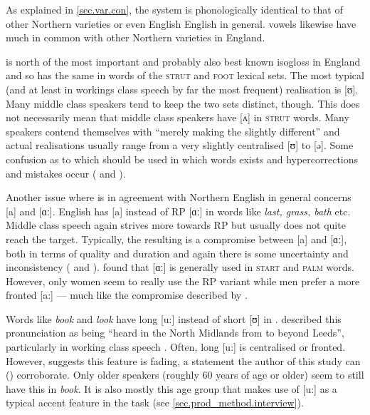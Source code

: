 As explained in \ref{sec.var.con}, the   system is phonologically identical to that of other Northern varieties or even English English in general.
 vowels likewise have much in common with other Northern varieties in England.

 is north of the most important and probably also best known isogloss in England and so has the same  in words of the \textsc{strut} and \textsc{foot} lexical sets.
The most typical (and at least in workings class speech by far the most frequent) realisation is [ʊ].
Many middle class speakers tend to keep the  two sets distinct, though.
This does not necessarily mean that middle class speakers have [ʌ] in \textsc{strut} words.
Many speakers contend themselves with ``merely making the  slightly different'' \citep[284]{knowles1973} and actual realisations usually range from a very slightly centralised [ʊ] to [ə].
Some confusion as to which  should be used in which words exists and hypercorrections and mistakes occur (\citealp[cf.][286--287]{knowles1973} and \citealp[83]{knowles1978}).

Another issue where  is in agreement with Northern English in general concerns [a] and [ɑː].
 English has [a] instead of RP [ɑː] in words like \emph{last, grass, bath} etc.
Middle class speech again strives more towards RP but usually does not quite reach the target.
Typically, the resulting  is a compromise between [a] and [ɑː], both in terms of quality and duration and again there is some uncertainty and inconsistency (\citealp[cf.][287--289]{knowles1973} and \citeyear[83--84]{knowles1978}).
\citeauthor{watson2007} found that [ɑː] is generally used in \textsc{start} and \textsc{palm} words.
However, only women seem to really use the RP variant while men prefer a more fronted [a:] \citeyearpar[cf.][358]{watson2007} --- much like the compromise described by \citeauthor{knowles1973}.

Words like \emph{book} and \emph{look} have long [u:] instead of short [ʊ] in .
\citet{knowles1973} described this pronunciation as being ``heard in the North Midlands from  to beyond Leeds'', particularly in working class speech \citep[290]{knowles1973}.
Often, long [u:] is centralised or fronted.
However, \citet[358]{watson2007} suggests this feature is fading, a statement the author of this study can () corroborate.
Only older speakers (roughly 60 years of age or older) seem to still have this  in \emph{book}.
It is also mostly this age group that makes use of [u:] as a typical accent feature in the  task (see \ref{sec.prod_method.interview}).

